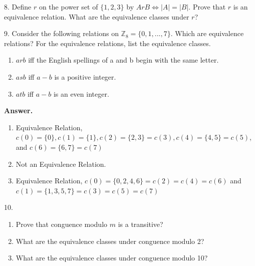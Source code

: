 \documentclass[10pt,]{book}
\theoremstyle{plain}
\theoremstyle{definition}
\theoremstyle{definition}
\theoremstyle{definition}
\theoremstyle{definition}
\begin{document}
\begin{exercisegroup}
\begin{enumerate}[label=\alph*]
\end{enumerate}
%
\item[8.]\hypertarget{exercise-20}{}Define \(r\) on the power set of \(\{1, 2, 3\}\) by \(A r B \Leftrightarrow  \lvert A \rvert = \lvert B \rvert \). Prove that \(r\) is an equivalence
relation. What are the equivalence classes under \(r\)?%
\par\smallskip
\item[9.]\hypertarget{exercise-21}{}Consider the following relations on \(\mathbb{Z}_8= \{0, 1, . . . , 7\}\). Which are equivalence relations? For the equivalence relations, list the equivalence classes.%
\par
\leavevmode%
\begin{enumerate}[label=\alph*]
\item\hypertarget{li-68}{} \(a r b\) iff the English spellings of a and b begin with the same letter.%
\item\hypertarget{li-69}{} \(a s b\) iff \(a - b\) is a positive integer.%
\item\hypertarget{li-70}{} \(a t b\) iff \(a-b\) is an even integer.%
\end{enumerate}
%
\par\smallskip
\par\smallskip
\noindent\textbf{Answer.}\hypertarget{answer-11}{}\quad
\leavevmode%
\begin{enumerate}[label=\alph*]
\item\hypertarget{li-71}{}Equivalence Relation,
 \(c(0)=\{0\},c(1)=\{1\},c(2)=\{2,3\} =c(3),c(4)=\{4,5\}=c(5)\), and
 \(c(6)=\{6,7\}=c(7)\)%
\item\hypertarget{li-72}{}  Not an Equivalence Relation.%
\item\hypertarget{li-73}{}  Equivalence Relation,
 \(c(0)=\{0,2,4,6\}=c(2)=c(4)=c(6)\)  and 
 \(c(1)=\{1,3,5,7\}=c(3)=c(5)=c(7)\)%
\end{enumerate}
%
\item[10.]\hypertarget{exercise-22}{}\leavevmode%
\begin{enumerate}[label=\alph*]
\item\hypertarget{li-74}{}Prove that conguence modulo \(m\) is a transitive?%
\item\hypertarget{li-75}{}What are the equivalence classes under conguence modulo 2?%
\item\hypertarget{li-76}{} What are the equivalence classes under conguence modulo 10? %
\end{enumerate}
%
\par\smallskip
\end{exercisegroup}
\end{document}
